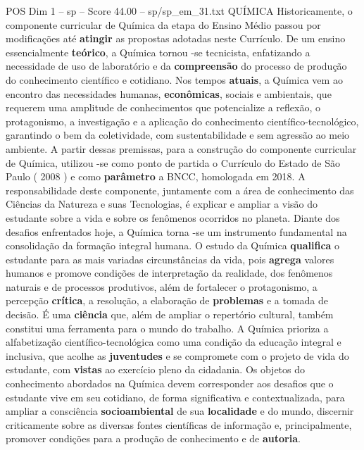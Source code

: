 \begin{textsample}{POS Dim 1 – sp – Score 44.00 – sp/sp\_em\_31.txt}  \label{ex:f1_pos_112}
QUÍMICA Historicamente, o componente curricular de Química da etapa do Ensino Médio passou por modificações até \textbf{atingir} as propostas adotadas neste Currículo.
De um ensino essencialmente \textbf{teórico}, a Química tornou -se tecnicista, enfatizando a necessidade de uso de laboratório e da \textbf{compreensão} do processo de produção do conhecimento científico e cotidiano.
Nos tempos \textbf{atuais}, a Química vem ao encontro das necessidades humanas, \textbf{econômicas}, sociais e ambientais, que requerem uma amplitude de conhecimentos que potencialize a reflexão, o protagonismo, a investigação e a aplicação do conhecimento científico-tecnológico, garantindo o bem da coletividade, com sustentabilidade e sem agressão ao meio ambiente.
A partir dessas premissas, para a construção do componente curricular de Química, utilizou -se como ponto de partida o Currículo do Estado de São Paulo ( 2008 ) e como \textbf{parâmetro} a BNCC, homologada em 2018.
A responsabilidade deste componente, juntamente com a área de conhecimento das Ciências da Natureza e suas Tecnologias, é explicar e ampliar a visão do estudante sobre a vida e sobre os fenômenos ocorridos no planeta.
Diante dos desafios enfrentados hoje, a Química torna -se um instrumento fundamental na consolidação da formação integral humana.
O estudo da Química \textbf{qualifica} o estudante para as mais variadas circunstâncias da vida, pois \textbf{agrega} valores humanos e promove condições de interpretação da realidade, dos fenômenos naturais e de processos produtivos, além de fortalecer o protagonismo, a percepção \textbf{crítica}, a resolução, a elaboração de \textbf{problemas} e a tomada de decisão.
É uma \textbf{ciência} que, além de ampliar o repertório cultural, também constitui uma ferramenta para o mundo do trabalho.
A Química prioriza a alfabetização científico-tecnológica como uma condição da educação integral e inclusiva, que acolhe as \textbf{juventudes} e se compromete com o projeto de vida do estudante, com \textbf{vistas} ao exercício pleno da cidadania.
Os objetos do conhecimento abordados na Química devem corresponder aos desafios que o estudante vive em seu cotidiano, de forma significativa e contextualizada, para ampliar a consciência \textbf{socioambiental} de sua \textbf{localidade} e do mundo, discernir criticamente sobre as diversas fontes científicas de informação e, principalmente, promover condições para a produção de conhecimento e de \textbf{autoria}.

\end{textsample}

